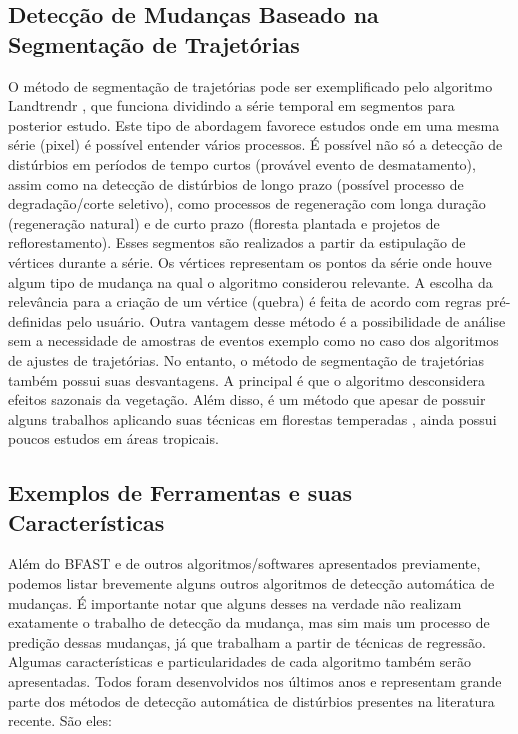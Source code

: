 \documentclass[12pt,a4paper]{article}
\begin{document}
\subsection{Detecção de Mudanças Baseado na Segmentação de Trajetórias}
O método de segmentação de trajetórias pode ser exemplificado pelo algoritmo Landtrendr \citep{KENNEDY20102897, KENNEDY2012117}, que funciona dividindo a série temporal em segmentos para posterior estudo. Este tipo de abordagem favorece estudos onde em uma mesma série (pixel) é possível entender vários processos. É possível não só a detecção de distúrbios em períodos de tempo curtos (provável evento de desmatamento), assim como na detecção de distúrbios de longo prazo (possível processo de degradação/corte seletivo), como processos de regeneração com longa duração (regeneração natural) e de curto prazo (floresta plantada e projetos de reflorestamento). Esses segmentos são realizados a partir da estipulação de vértices durante a série. Os vértices representam os pontos da série onde houve algum tipo de mudança na qual o algoritmo considerou relevante. A escolha da relevância para a criação de um vértice (quebra) é feita de acordo com regras pré-definidas pelo usuário. Outra vantagem desse método é a possibilidade de análise sem a necessidade de amostras de eventos exemplo como no caso dos algoritmos de ajustes de trajetórias.
No entanto, o método de segmentação de trajetórias também possui suas desvantagens. A principal é que o algoritmo desconsidera efeitos sazonais da vegetação. Além disso, é um método que apesar de possuir alguns trabalhos aplicando suas técnicas em florestas temperadas \citep{PFLUGMACHER2012146, Griffiths2015}, ainda possui poucos estudos em áreas tropicais.

\subsection{Exemplos de Ferramentas e suas Características}
Além do BFAST e de outros algoritmos/softwares apresentados previamente, podemos listar brevemente alguns outros algoritmos de detecção automática de mudanças. É importante notar que alguns desses na verdade não realizam exatamente o trabalho de detecção da mudança, mas sim mais um processo de predição dessas mudanças, já que trabalham a partir de técnicas de regressão. Algumas características e particularidades de cada algoritmo também serão apresentadas. Todos foram desenvolvidos nos últimos anos e representam grande parte dos métodos de detecção automática de distúrbios presentes na literatura recente. São eles: 
\end{document}
